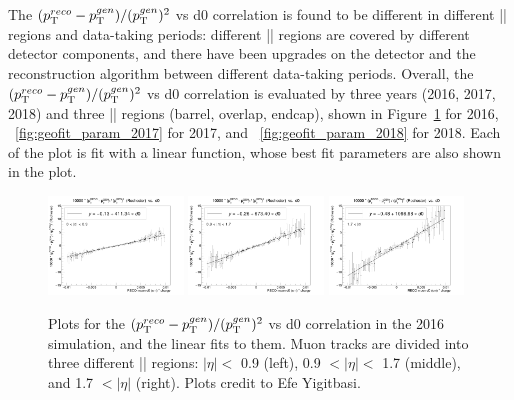 The $(p_{\mathrm{T}}^{reco}-p_{\mathrm{T}}^{gen})/ (p_{\mathrm{T}}^{gen})^{2}$ vs d0 correlation is found to be different in different |\eta| regions and data-taking periods: 
different |\eta| regions are covered by different detector components, and there have been upgrades on the detector and the reconstruction algorithm between different data-taking periods.
Overall, the $(p_{\mathrm{T}}^{reco}-p_{\mathrm{T}}^{gen})/ (p_{\mathrm{T}}^{gen})^{2}$ vs d0 correlation is evaluated by three years (2016, 2017, 2018) and 
three |\eta| regions (barrel, overlap, endcap), shown in Figure~\ref{fig:geofit_param_2016} for 2016, ~\ref{fig:geofit_param_2017} for 2017, and ~\ref{fig:geofit_param_2018} for 2018.
Each of the plot is fit with a linear function, whose best fit parameters are also shown in the plot.

\begin{figure}[!htb]
      \centering
      \captionsetup{justification=justified}
      \includegraphics[width=0.32\textwidth]{pics/muon_corr/GeoFit/fit_results/2016_DY_eta_0_0p9_dRelPt2p0_Roch.png}
      \includegraphics[width=0.32\textwidth]{pics/muon_corr/GeoFit/fit_results/2016_DY_eta_0p9_1p7_dRelPt2p0_Roch.png}
      \includegraphics[width=0.32\textwidth]{pics/muon_corr/GeoFit/fit_results/2016_DY_eta_1p7_inf_dRelPt2p0_Roch.png}
      \caption{Plots for the $(p_{\mathrm{T}}^{reco}-p_{\mathrm{T}}^{gen})/ (p_{\mathrm{T}}^{gen})^{2}$ vs d0 correlation in the 2016 \DY simulation, 
               and the linear fits to them. Muon tracks are divided into three different |\eta| regions:
               $|\eta| <$ 0.9 (left), 0.9 $< |\eta| <$ 1.7 (middle), and 1.7 $< |\eta|$ (right).
               Plots credit to Efe Yigitbasi.}
      \label{fig:geofit_param_2016}
\end{figure}

